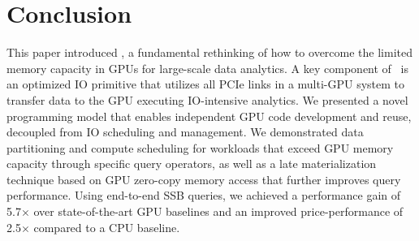 \section{Conclusion} \label{section:conclusion}
This paper introduced \THISWORK, a fundamental rethinking of how to overcome the limited memory capacity in GPUs for large-scale data analytics. 
A key component of \THISWORK~is an optimized IO primitive that utilizes all PCIe links in a multi-GPU system to transfer data to the GPU executing IO-intensive analytics. 
We presented a novel programming model that enables independent GPU code development and reuse, decoupled from IO scheduling and management.
We demonstrated data partitioning and compute scheduling for workloads that exceed GPU memory capacity through specific query operators, as well as a late materialization technique based on GPU zero-copy memory access that further improves query performance.
Using end-to-end SSB queries, we achieved a performance gain of 5.7$\times$ over state-of-the-art GPU baselines and an improved price-performance of 2.5$\times$ compared to a CPU baseline.
